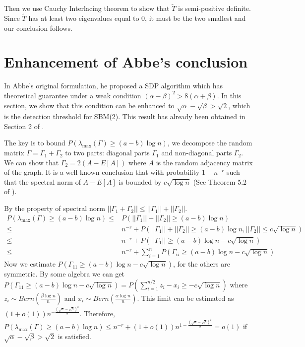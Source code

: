 \documentclass{article}
\begin{document}
Then we use Cauchy Interlacing theorem to show that $\widetilde{T}$ is semi-positive definite.
Since $\widetilde{T}$ has at least two eigenvalues equal to 0, it must be the two smallest and our conclusion follows.

\section{Enhancement of Abbe's conclusion}\label{sec:original}
In Abbe's original formulation, he proposed a SDP algorithm which has theoretical
guarantee under a weak condition $(\alpha - \beta)^2 > 8(\alpha + \beta)$.
In this section, we show that this condition can be enhanced to $\sqrt{\alpha} - \sqrt{\beta} > \sqrt{2}$, which
is the detection threshold for SBM(2).
This result has already been obtained in Section 2 of \cite{hajek2016achieving}.

The key is to bound
$P(\lambda_{\max}(\Gamma) \geq (a-b)\log n)$,
we decompose the random matrix $\Gamma=\Gamma_1 +\Gamma_2$ to two parts: diagonal parts $\Gamma_1$ and non-diagonal parts $\Gamma_2$.
We can show that $\Gamma_2 = 2(A-E[A])$ where $A$ is the random adjacency matrix of the graph. It is a well known conclusion that
with probability $1-n^{-r}$ such that the spectral norm of $A-E[A]$ is bounded by $c\sqrt{\log n}$ (See Theorem 5.2 of \cite{lei2015consistency}).

By the property of spectral norm $||\Gamma_1 + \Gamma_2|| \leq ||\Gamma_1 || + ||\Gamma_2||$.
\begin{align*}
P(\lambda_{\max}(\Gamma) \geq (a-b)\log n) \leq & P(||\Gamma_1 || + ||\Gamma_2|| \geq (a-b) \log n)  \\
\leq & n^{-r} +
P(||\Gamma_1 || + ||\Gamma_2|| \geq (a-b) \log n, ||\Gamma_2||
\leq c\sqrt{\log n})\\
\leq & n^{-r} + P(||\Gamma_1|| \geq (a-b)\log n -c\sqrt{\log n}) \\
\leq & n^{-r} + \sum_{i=1}^n P(\Gamma_{ii} \geq (a-b)\log n -c\sqrt{\log n})
\end{align*}
Now we estimate $P(\Gamma_{11} \geq (a-b)\log n -c\sqrt{\log n})$, for the others are symmetric.
By some algebra we can get
$P(\Gamma_{11} \geq (a-b)\log n -c\sqrt{\log n}) = P(\sum_{i=1}^{n/2} z_i - x_i \geq -c\sqrt{\log n})$
where $z_i \sim Bern(\frac{\beta \log n}{n})$ and $x_i \sim Bern(\frac{\alpha \log n}{n})$.
This limit can be estimated as $(1+o(1))n^{-\frac{(\sqrt{\alpha}-\sqrt{\beta})^2}{2}}$.
Therefore, $P(\lambda_{\max}(\Gamma) \geq (a-b)\log n)\leq n^{-r} + (1+o(1))n^{1-\frac{(\sqrt{\alpha}-\sqrt{\beta})^2}{2}} = o(1)$
if $\sqrt{\alpha} - \sqrt{\beta} > \sqrt{2}$ is satisfied.
\end{document}
